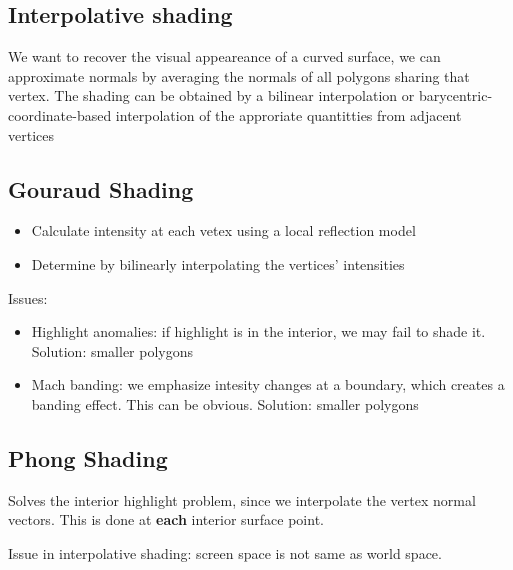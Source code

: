 \documentclass[a4paper]{article}
\begin{document}
\subsection{Interpolative shading}
We want to recover the visual appeareance of a curved surface, we can approximate normals by averaging the normals of all polygons sharing that vertex. The shading can be obtained by a bilinear interpolation or barycentric-coordinate-based interpolation of the approriate quantitties from adjacent vertices

\subsection{Gouraud Shading}
\begin{itemize}
	\item Calculate intensity at each vetex using a local reflection model
	\item Determine by bilinearly interpolating the vertices' intensities
\end{itemize}Issues:
\begin{itemize}
	\item Highlight anomalies: if highlight is in the interior, we may fail to shade it. Solution: smaller polygons
	\item Mach banding: we emphasize intesity changes at a boundary, which creates a banding effect. This can be obvious. Solution: smaller polygons
\end{itemize}

\subsection{Phong Shading}
Solves the interior highlight problem, since we interpolate the vertex normal vectors. This is done at \textbf{each} interior surface point.

Issue in interpolative shading: screen space is not same as world space.
\end{document}
